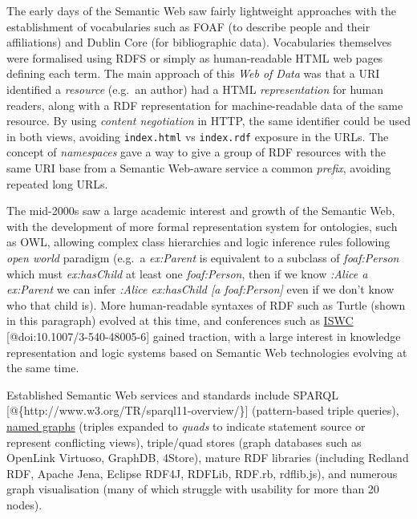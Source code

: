 The early days of the Semantic Web saw fairly lightweight approaches
with the establishment of vocabularies such as FOAF (to describe people
and their affiliations) and Dublin Core (for bibliographic data).
Vocabularies themselves were formalised using RDFS or simply as
human-readable HTML web pages defining each term. The main approach of
this \emph{Web of Data} was that a URI identified a \emph{resource}
(e.g.~an author) had a HTML \emph{representation} for human readers,
along with a RDF representation for machine-readable data of the same
resource. By using \emph{content negotiation} in HTTP, the same
identifier could be used in both views, avoiding \texttt{index.html} vs
\texttt{index.rdf} exposure in the URLs. The concept of
\emph{namespaces} gave a way to give a group of RDF resources with the
same URI base from a Semantic Web-aware service a common \emph{prefix},
avoiding repeated long URLs.

The mid-2000s saw a large academic interest and growth of the Semantic
Web, with the development of more formal representation system for
ontologies, such as OWL, allowing complex class hierarchies and logic
inference rules following \emph{open world} paradigm (e.g.~a
\emph{ex:Parent} is equivalent to a subclass of \emph{foaf:Person} which
must \emph{ex:hasChild} at least one \emph{foaf:Person}, then if we know
\emph{:Alice a ex:Parent} we can infer \emph{:Alice ex:hasChild {[}a
foaf:Person{]}} even if we don't know who that child is). More
human-readable syntaxes of RDF such as Turtle (shown in this paragraph)
evolved at this time, and conferences such as
\href{https://iswc2022.semanticweb.org/}{ISWC}
{[}@doi:10.1007/3-540-48005-6{]} gained traction, with a large interest
in knowledge representation and logic systems based on Semantic Web
technologies evolving at the same time.

Established Semantic Web services and standards include SPARQL
{[}@\{http://www.w3.org/TR/sparql11-overview/\}{]} (pattern-based triple
queries),
\href{https://www.w3.org/TR/rdf11-concepts/\#section-dataset}{named
graphs} (triples expanded to \emph{quads} to indicate statement source
or represent conflicting views), triple/quad stores (graph databases
such as OpenLink Virtuoso, GraphDB, 4Store), mature RDF libraries
(including Redland RDF, Apache Jena, Eclipse RDF4J, RDFLib, RDF.rb,
rdflib.js), and numerous graph visualisation (many of which struggle
with usability for more than 20 nodes).

